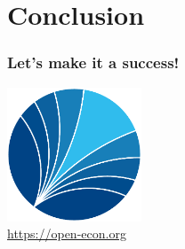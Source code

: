 \section{Conclusion}

\begin{frame}[standout]\frametitle{Let's make it a success!}\vspace{1.5cm}

\hspace{1.5cm}\href{https://open-econ.org}{\includegraphics[height=4cm]{material/ose-logo-no-type-rgb.pdf}}
\\[-2.225cm]
\hspace{5.8cm}\textcolor{OSEBlue}{\fontsize{15pt}{15pt}\selectfont \href{https://open-econ.org}{https://open-econ.org}} 

\end{frame}
